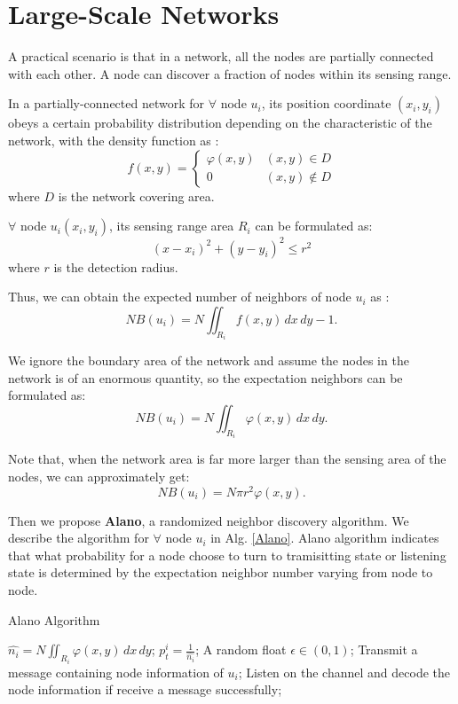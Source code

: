 \section{Large-Scale Networks}
\label{PCN}



A practical scenario is that in a network,
all the nodes are partially connected with each other.
A node can discover a fraction of nodes within its sensing 
range.

In a partially-connected network for $\forall$ node $u_i$, 
its position coordinate $(x_i,y_i)$
obeys a certain probability distribution depending on the 
characteristic of the network, with the density function as :
$$f(x,y)=
\begin{cases}
\varphi(x,y)& (x,y)\in D\\
0& (x,y)\notin D
\end{cases}$$
where $D$ is the network covering area.

$\forall$ node $u_i (x_i,y_i)$, its sensing range area $R_i$ can be formulated as:
$$
(x-x_i)^2+(y-y_i)^2 \leq r^2
$$
where $r$ is the detection radius.

Thus, we can obtain the expected number of neighbors of node $u_i$ as :
$$
NB(u_i) = N\iint_{R_i} f(x,y)\,dx\,dy - 1.
$$

We ignore the boundary area of the network and assume the
nodes in the network is of an enormous quantity, so the 
expectation neighbors can be formulated as:
$$
NB(u_i) = N\iint_{R_i} \varphi(x,y)\,dx\,dy.
$$

Note that, when the network area is far more larger than the
sensing area of the nodes, we can approximately get:
$$
NB(u_i) = N\pi r^2 \varphi(x,y).
$$




Then we propose \textbf{Alano}, a randomized neighbor discovery algorithm. 
We describe the algorithm for $\forall$ node $u_i$ in Alg. \ref{Alano}.
Alano algorithm indicates that what probability for a node choose to turn to  
tramisitting state or listening state is determined
by the expectation neighbor number varying from node to node.


\begin{algorithm}
\caption{Alano Algorithm}
\label{Alano}
\begin{algorithmic}[1]
\STATE $\hat{n_i} = N\iint_{R_i} \varphi(x,y)\,dx\,dy$;
\STATE $p_t^i = \frac{1}{\hat{n_i}}$;
	\STATE A random float $\epsilon \in (0,1)$;
    		\STATE Transmit a message containing node information of $u_i$;
	\ELSE
    		\STATE Listen on the channel and decode the node information if receive a message successfully;
	\ENDIF
\ENDWHILE
\end{algorithmic}
\end{algorithm}

